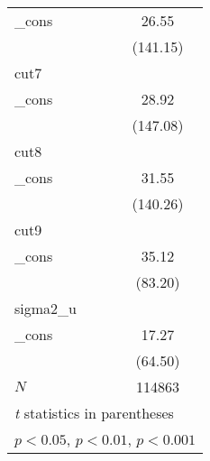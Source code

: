 {\begin{tabular}{l*{1}{c}}
\_cons      &       26.55\sym{***}\\
            &    (141.15)         \\
\hline
cut7        &                     \\
\_cons      &       28.92\sym{***}\\
            &    (147.08)         \\
\hline
cut8        &                     \\
\_cons      &       31.55\sym{***}\\
            &    (140.26)         \\
\hline
cut9        &                     \\
\_cons      &       35.12\sym{***}\\
            &     (83.20)         \\
\hline
sigma2\_u    &                     \\
\_cons      &       17.27\sym{***}\\
            &     (64.50)         \\
\hline
\(N\)       &      114863         \\
\hline\hline
\multicolumn{2}{l}{\footnotesize \textit{t} statistics in parentheses}\\
\multicolumn{2}{l}{\footnotesize \sym{*} \(p<0.05\), \sym{**} \(p<0.01\), \sym{***} \(p<0.001\)}\\
\end{tabular}
}
